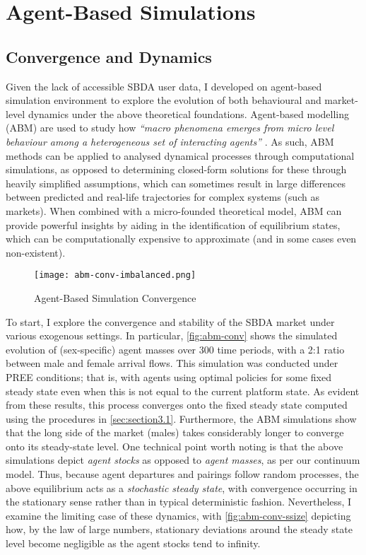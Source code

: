 \section{Agent-Based Simulations}
\label{sec:section4}  
\subsection{Convergence and Dynamics}
Given the lack of accessible SBDA user data, I developed on agent-based simulation environment to explore the evolution of both behavioural and market-level dynamics under the above theoretical foundations. Agent-based modelling (ABM) are used to study how \textit{``macro phenomena emerges from micro level behaviour among a heterogeneous set of interacting agents''} \citep{janssen2005agent}. As such, ABM methods can be applied to analysed dynamical processes through computational simulations, as opposed to determining closed-form solutions for these through heavily simplified assumptions, which can sometimes result in large differences between predicted and real-life trajectories for complex systems (such as markets).
When combined with a micro-founded theoretical model, ABM can provide powerful insights by aiding in the identification of equilibrium states, which can be computationally expensive to approximate (and in some cases even non-existent).

\begin{figure}[ht]
    \centering
    \caption{Agent-Based Simulation Convergence}
    \texttt{[image: abm-conv-imbalanced.png]}
    \label{fig:abm-conv} 
\end{figure}

To start, I explore the convergence and stability of the SBDA market under various exogenous settings. In particular, \autoref{fig:abm-conv} shows the simulated evolution of (sex-specific) agent masses over 300 time periods, with a 2:1 ratio between male and female arrival flows. This simulation was conducted under PREE conditions; that is, with agents using optimal policies for some fixed steady state even when this is not equal to the current platform state.  
As evident from these results, this process converges onto the fixed steady state computed using the procedures in \autoref{sec:section3.1}. Furthermore, the ABM simulations show that the long side of the market (males) takes considerably longer to converge onto its steady-state level. One technical point worth noting is that the above simulations depict \textit{agent stocks} as opposed to \textit{agent masses}, as per our continuum model. Thus, because agent departures and pairings follow random processes, the above equilibrium acts as a \textit{stochastic steady state}, with convergence occurring in the stationary sense rather than in typical deterministic fashion. Nevertheless, I examine the limiting case of these dynamics, with \autoref{fig:abm-conv-ssize} depicting how, by the law of large numbers, stationary deviations around the steady state level become negligible as the agent stocks tend to infinity. 

